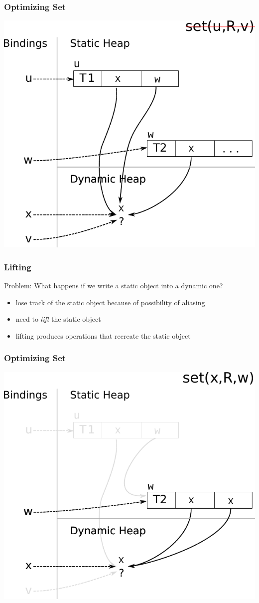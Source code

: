 \documentclass[utf8x]{beamer}
\begin{document}
\begin{frame}[plain]
  \frametitle{Optimizing Set}
  \includegraphics[scale=0.8]{figures/opt_set2}
\end{frame}

\begin{frame}
  \frametitle{Lifting}
  Problem: What happens if we write a static object into a dynamic one?
  \pause
  \begin{itemize}
      \item lose track of the static object because of possibility of aliasing
      \item need to \emph{lift} the static object
      \item lifting produces operations that recreate the static object
  \end{itemize}
\end{frame}


\begin{frame}[plain]
  \frametitle{Optimizing Set}
  \includegraphics[scale=0.8]{figures/opt_set_dynamic1}
\end{frame}
\end{document}
